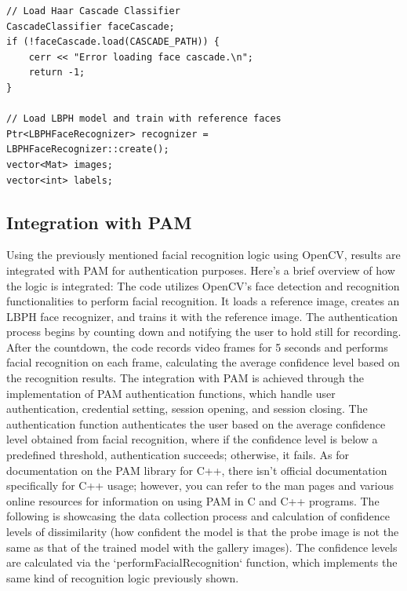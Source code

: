 \documentclass[
]{article}
\begin{document}
\begin{multicols}{2}
\begin{verbatim}
// Load Haar Cascade Classifier
CascadeClassifier faceCascade;
if (!faceCascade.load(CASCADE_PATH)) {
    cerr << "Error loading face cascade.\n";
    return -1;
}

// Load LBPH model and train with reference faces
Ptr<LBPHFaceRecognizer> recognizer = 
LBPHFaceRecognizer::create();
vector<Mat> images;
vector<int> labels;
\end{verbatim}

\end{multicols}

\begin{multicols}{2}

\section{Integration with PAM}
Using the previously mentioned facial recognition logic using OpenCV, results are integrated with PAM for authentication purposes. Here's a brief overview of how the logic is integrated: The code utilizes OpenCV's face detection and recognition functionalities to perform facial recognition. It loads a reference image, creates an LBPH face recognizer, and trains it with the reference image. The authentication process begins by counting down and notifying the user to hold still for recording. After the countdown, the code records video frames for 5 seconds and performs facial recognition on each frame, calculating the average confidence level based on the recognition results. The integration with PAM is achieved through the implementation of PAM authentication functions, which handle user authentication, credential setting, session opening, and session closing. The authentication function authenticates the user based on the average confidence level obtained from facial recognition, where if the confidence level is below a predefined threshold, authentication succeeds; otherwise, it fails. As for documentation on the PAM library for C++, there isn't official documentation specifically for C++ usage; however, you can refer to the man pages and various online resources for information on using PAM in C and C++ programs. The following is showcasing the data collection process and calculation of confidence levels of dissimilarity (how confident the model is that the probe image is not the same as that of the trained model with the gallery images). The confidence levels are calculated via the `performFacialRecognition` function, which implements the same kind of recognition logic previously shown.


\end{multicols}
\end{document}
